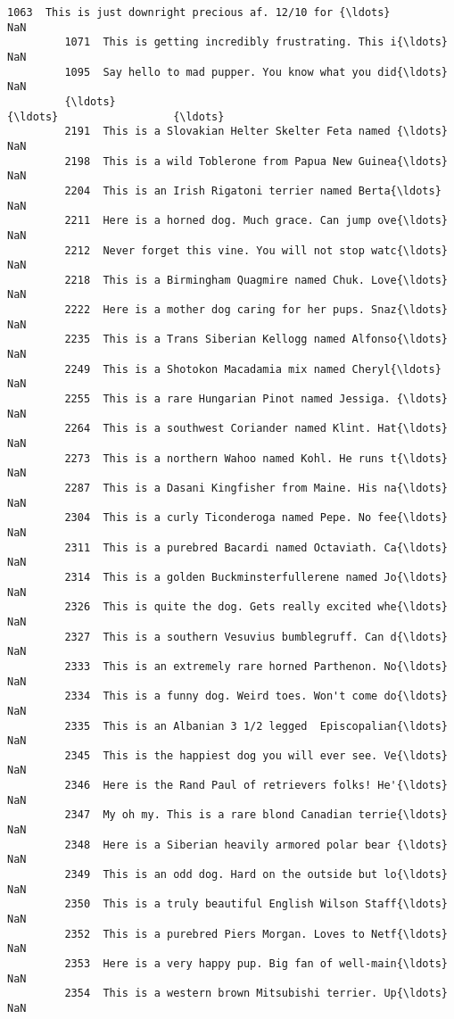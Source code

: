 \documentclass[11pt]{article}
\begin{document}
\begin{Verbatim}[commandchars=\\\{\}]
         1063  This is just downright precious af. 12/10 for {\ldots}                  NaN   
         1071  This is getting incredibly frustrating. This i{\ldots}                  NaN   
         1095  Say hello to mad pupper. You know what you did{\ldots}                  NaN   
         {\ldots}                                                 {\ldots}                  {\ldots}   
         2191  This is a Slovakian Helter Skelter Feta named {\ldots}                  NaN   
         2198  This is a wild Toblerone from Papua New Guinea{\ldots}                  NaN   
         2204  This is an Irish Rigatoni terrier named Berta{\ldots}                  NaN   
         2211  Here is a horned dog. Much grace. Can jump ove{\ldots}                  NaN   
         2212  Never forget this vine. You will not stop watc{\ldots}                  NaN   
         2218  This is a Birmingham Quagmire named Chuk. Love{\ldots}                  NaN   
         2222  Here is a mother dog caring for her pups. Snaz{\ldots}                  NaN   
         2235  This is a Trans Siberian Kellogg named Alfonso{\ldots}                  NaN   
         2249  This is a Shotokon Macadamia mix named Cheryl{\ldots}                  NaN   
         2255  This is a rare Hungarian Pinot named Jessiga. {\ldots}                  NaN   
         2264  This is a southwest Coriander named Klint. Hat{\ldots}                  NaN   
         2273  This is a northern Wahoo named Kohl. He runs t{\ldots}                  NaN   
         2287  This is a Dasani Kingfisher from Maine. His na{\ldots}                  NaN   
         2304  This is a curly Ticonderoga named Pepe. No fee{\ldots}                  NaN   
         2311  This is a purebred Bacardi named Octaviath. Ca{\ldots}                  NaN   
         2314  This is a golden Buckminsterfullerene named Jo{\ldots}                  NaN   
         2326  This is quite the dog. Gets really excited whe{\ldots}                  NaN   
         2327  This is a southern Vesuvius bumblegruff. Can d{\ldots}                  NaN   
         2333  This is an extremely rare horned Parthenon. No{\ldots}                  NaN   
         2334  This is a funny dog. Weird toes. Won't come do{\ldots}                  NaN   
         2335  This is an Albanian 3 1/2 legged  Episcopalian{\ldots}                  NaN   
         2345  This is the happiest dog you will ever see. Ve{\ldots}                  NaN   
         2346  Here is the Rand Paul of retrievers folks! He'{\ldots}                  NaN   
         2347  My oh my. This is a rare blond Canadian terrie{\ldots}                  NaN   
         2348  Here is a Siberian heavily armored polar bear {\ldots}                  NaN   
         2349  This is an odd dog. Hard on the outside but lo{\ldots}                  NaN   
         2350  This is a truly beautiful English Wilson Staff{\ldots}                  NaN   
         2352  This is a purebred Piers Morgan. Loves to Netf{\ldots}                  NaN   
         2353  Here is a very happy pup. Big fan of well-main{\ldots}                  NaN   
         2354  This is a western brown Mitsubishi terrier. Up{\ldots}                  NaN   
         

\end{Verbatim}
\end{document}
